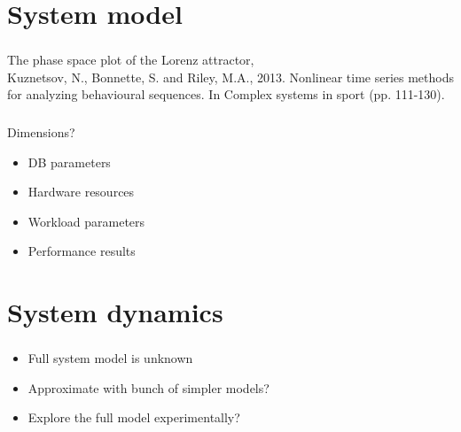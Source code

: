 \documentclass[usenames,dvipsnames, 18pt, compress, aspectratio=169]{beamer}
\begin{document}
\section{System model}

\begin{frame}
    \frametitle{}
    \begin{center}
        {
            The phase space plot of the Lorenz attractor, \\
            {\scriptsize
             \color{gray!60}
                 Kuznetsov, N., Bonnette, S. and Riley, M.A., 2013. Nonlinear time series methods\\
                 for analyzing behavioural sequences. In Complex systems in sport (pp. 111-130).}}

    \end{center}
\end{frame}

\begin{frame}
    \frametitle{}
    \begin{center}
        Dimensions?

        \begin{itemize}
            \item DB parameters
            \item Hardware resources
            \item Workload parameters
            \item Performance results
        \end{itemize}
    \end{center}
\end{frame}

\section{System dynamics}

\begin{frame}[fragile]{}
    \frametitle{}
    \begin{center}

        \begin{itemize}
            \item Full system model is unknown
            \item Approximate with bunch of simpler models?
            \item Explore the full model experimentally?
        \end{itemize}

    \end{center}
\end{frame}
\end{document}
